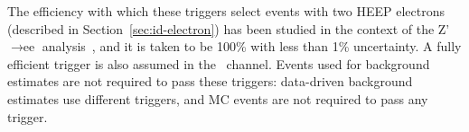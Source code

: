 The efficiency with which these triggers select events with two HEEP electrons 
(described in Section~\ref{sec:id-electron}) has been studied in the context of the Z'$\rightarrow \mbox{ee}$ 
analysis~\cite{zprime-2011}, and it is taken to be 100\% with less than 1\% uncertainty.
A fully efficient trigger is also assumed in the \eejj~channel.
Events used for background estimates are not required to pass these triggers:
data-driven background estimates use different triggers, and MC events are not required to pass any trigger.
